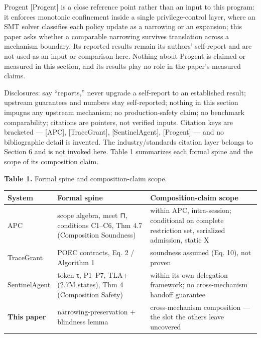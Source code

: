 \documentclass[
  10pt,
]{article}
\newcounter{none} %
\renewcommand{\_}{\origunderscore\allowbreak}
\begin{document}
Progent {[}Progent{]} is a close reference point rather than an input to
this program: it enforces monotonic confinement inside a single
privilege-control layer, where an SMT solver classifies each policy
update as a narrowing or an expansion; this paper asks whether a
comparable narrowing survives translation across a mechanism boundary.
Its reported results remain its authors' self-report and are not used as
an input or comparison here. Nothing about Progent is claimed or
measured in this section, and its results play no role in the paper's
measured claims.

Disclosures: say ``reports,'' never upgrade a self-report to an
established result; upstream guarantees and numbers stay self-reported;
nothing in this section impugns any upstream mechanism; no
production-safety claim; no benchmark comparability; citations are
pointers, not verified inputs. Citation keys are bracketed ---
{[}APC{]}, {[}TraceGrant{]}, {[}SentinelAgent{]}, {[}Progent{]} --- and
no bibliographic detail is invented. The industry/standards citation
layer belongs to Section 6 and is not invoked here. Table 1 summarizes
each formal spine and the scope of its composition claim.

\textbf{Table 1.} Formal spine and composition-claim scope.

{\def\LTcaptype{none} %
\begin{longtable}[]{@{}
  >{\raggedright\arraybackslash}p{}
  >{\raggedright\arraybackslash}p{}
  >{\raggedright\arraybackslash}p{}@{}}
\toprule\noalign{}
\begin{minipage}[b]{\linewidth}\raggedright
System
\end{minipage} & \begin{minipage}[b]{\linewidth}\raggedright
Formal spine
\end{minipage} & \begin{minipage}[b]{\linewidth}\raggedright
Composition-claim scope
\end{minipage} \\
\midrule\noalign{}
\endhead
\bottomrule\noalign{}
\endlastfoot
APC & scope algebra, meet ⊓, conditions C1--C6, Thm 4.7 (Composition
Soundness) & within APC, intra-session; conditional on complete
restriction set, serialized admission, static X \\
TraceGrant & POEC contracts, Eq. 2 / Algorithm 1 & soundness assumed
(Eq. 10), not proven \\
SentinelAgent & token τ, P1--P7, TLA+ (2.7M states), Thm 4 (Composition
Safety) & within its own delegation framework; no cross-mechanism
handoff guarantee \\
\textbf{This paper} & narrowing-preservation + blindness lemma &
cross-mechanism composition --- the slot the others leave uncovered \\
\end{longtable}
}
\end{document}
